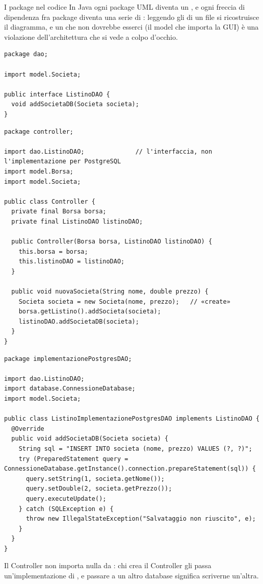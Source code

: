 \begin{esempio}{I package nel codice}
In Java ogni package UML diventa un , e ogni freccia di dipendenza fra package diventa una serie di
: leggendo gli  di un file si ricostruisce il diagramma, e un  che non dovrebbe
esserci (il model che importa la GUI) è una violazione dell'architettura che si vede a colpo d'occhio.
\begin{lstlisting}[style=java, name=dao/ListinoDAO.java]
package dao;

import model.Societa;

public interface ListinoDAO {
  void addSocietaDB(Societa societa);
}
\end{lstlisting}
\begin{lstlisting}[style=java, name=controller/Controller.java]
package controller;

import dao.ListinoDAO;              // l'interfaccia, non l'implementazione per PostgreSQL
import model.Borsa;
import model.Societa;

public class Controller {
  private final Borsa borsa;
  private final ListinoDAO listinoDAO;

  public Controller(Borsa borsa, ListinoDAO listinoDAO) {
    this.borsa = borsa;
    this.listinoDAO = listinoDAO;
  }

  public void nuovaSocieta(String nome, double prezzo) {
    Societa societa = new Societa(nome, prezzo);   // «create»
    borsa.getListino().addSocieta(societa);
    listinoDAO.addSocietaDB(societa);
  }
}
\end{lstlisting}
\begin{lstlisting}[style=java, name=implementazionePostgresDAO/ListinoImplementazionePostgresDAO.java]
package implementazionePostgresDAO;

import dao.ListinoDAO;
import database.ConnessioneDatabase;
import model.Societa;

public class ListinoImplementazionePostgresDAO implements ListinoDAO {
  @Override
  public void addSocietaDB(Societa societa) {
    String sql = "INSERT INTO societa (nome, prezzo) VALUES (?, ?)";
    try (PreparedStatement query = ConnessioneDatabase.getInstance().connection.prepareStatement(sql)) {
      query.setString(1, societa.getNome());
      query.setDouble(2, societa.getPrezzo());
      query.executeUpdate();
    } catch (SQLException e) {
      throw new IllegalStateException("Salvataggio non riuscito", e);
    }
  }
}
\end{lstlisting}
Il Controller non importa nulla da : chi crea il Controller gli passa
un'implementazione di , e passare a un altro database significa scriverne un'altra.
\end{esempio}


